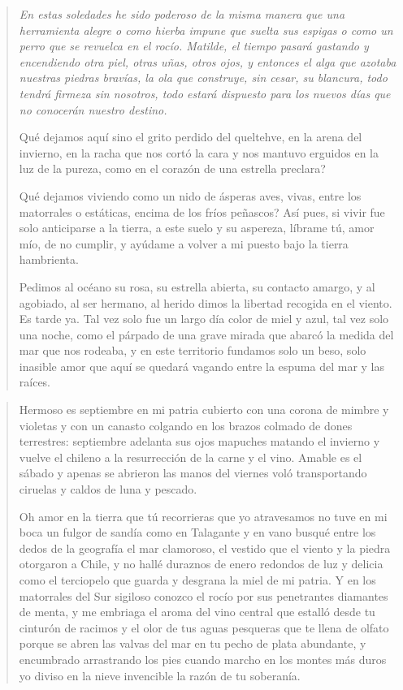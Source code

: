 \documentclass[12pt]{article}
\begin{document}
\clearpage
{}
\begin{verse}
\itshape
En estas soledades he sido poderoso  
de la misma manera que una herramienta alegre  
o como hierba impune que suelta sus espigas  
o como un perro que se revuelca en el rocío.  
Matilde, el tiempo pasará gastando y encendiendo  
otra piel, otras uñas, otros ojos, y entonces  
el alga que azotaba nuestras piedras bravías,  
la ola que construye, sin cesar, su blancura,  
todo tendrá firmeza sin nosotros,  
todo estará dispuesto para los nuevos días  
que no conocerán nuestro destino.  

Qué dejamos aquí sino el grito perdido  
del queltehve, en la arena del invierno, en la racha  
que nos cortó la cara y nos mantuvo  
erguidos en la luz de la pureza,  
como en el corazón de una estrella preclara?  

Qué dejamos viviendo como un nido  
de ásperas aves, vivas, entre los matorrales  
o estáticas, encima de los fríos peñascos?  
Así pues, si vivir fue solo anticiparse  
a la tierra, a este suelo y su aspereza,  
líbrame tú, amor mío, de no cumplir, y ayúdame  
a volver a mi puesto bajo la tierra hambrienta.  

Pedimos al océano su rosa,  
su estrella abierta, su contacto amargo,  
y al agobiado, al ser hermano, al herido  
dimos la libertad recogida en el viento.  
Es tarde ya. Tal vez  
solo fue un largo día color de miel y azul,  
tal vez solo una noche, como el párpado  
de una grave mirada que abarcó  
la medida del mar que nos rodeaba,  
y en este territorio fundamos solo un beso,  
solo inasible amor que aquí se quedará  
vagando entre la espuma del mar y las raíces.  

\end{verse}

\clearpage
{}
\begin{verse}
Hermoso es septiembre en mi patria cubierto con una corona de mimbre y violetas  
y con un canasto colgando en los brazos colmado de dones terrestres:  
septiembre adelanta sus ojos mapuches matando el invierno  
y vuelve el chileno a la resurrección de la carne y el vino.  
Amable es el sábado y apenas se abrieron las manos del viernes  
voló transportando ciruelas y caldos de luna y pescado.  

Oh amor en la tierra que tú recorrieras que yo atravesamos  
no tuve en mi boca un fulgor de sandía como en Talagante  
y en vano busqué entre los dedos de la geografía  
el mar clamoroso, el vestido que el viento y la piedra otorgaron a Chile,  
y no hallé duraznos de enero redondos de luz y delicia  
como el terciopelo que guarda y desgrana la miel de mi patria.  
Y en los matorrales del Sur sigiloso conozco el rocío  
por sus penetrantes diamantes de menta, y me embriaga el aroma  
del vino central que estalló desde tu cinturón de racimos  
y el olor de tus aguas pesqueras que te llena de olfato  
porque se abren las valvas del mar en tu pecho de plata abundante,  
y encumbrado arrastrando los pies cuando marcho en los montes más duros  
yo diviso en la nieve invencible la razón de tu soberanía.  

\end{verse}
\end{document}
